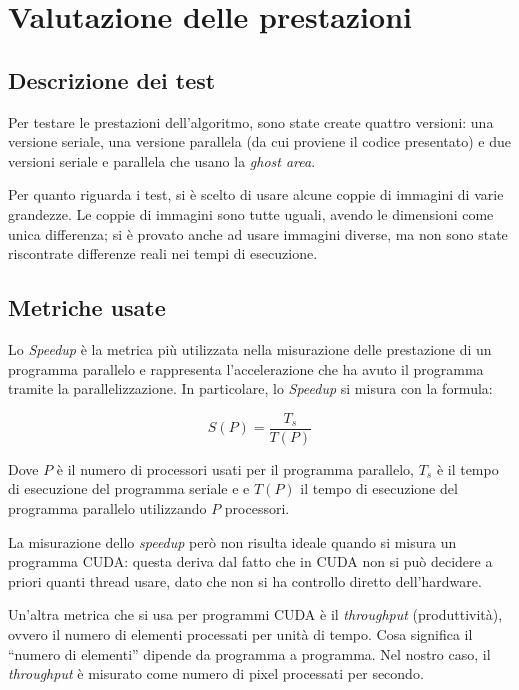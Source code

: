 \documentclass[12pt,a4paper,openright,twoside]{report}
\begin{document}
\chapter{Valutazione delle prestazioni}

\section{Descrizione dei test}

Per testare le prestazioni dell'algoritmo, sono state create quattro versioni: una versione seriale, una versione parallela (da cui proviene il codice presentato) e due versioni seriale e parallela che usano la \textit{ghost area}.

Per quanto riguarda i test, si è scelto di usare alcune coppie di immagini di varie grandezze. Le coppie di immagini sono tutte uguali, avendo le dimensioni come unica differenza; si è provato anche ad usare immagini diverse, ma non sono state riscontrate differenze reali nei tempi di esecuzione.


\section{Metriche usate}

Lo \textit{Speedup} è la metrica più utilizzata nella misurazione delle prestazione di un programma parallelo e rappresenta l'accelerazione che ha avuto il programma tramite la parallelizzazione. In particolare, lo \textit{Speedup} si misura con la formula:

\[ S(P) = \frac{T_{s}}{T(P)}  \]

Dove $P$ è il numero di processori usati per il programma parallelo, $T_{s}$ è il tempo di esecuzione del programma seriale e e $T(P)$ il tempo di esecuzione del programma parallelo utilizzando $P$ processori.

La misurazione dello \textit{speedup} però non risulta ideale quando si misura un programma CUDA: questa deriva dal fatto che in CUDA non si può decidere a priori quanti thread usare, dato che non si ha controllo diretto dell'hardware.

Un'altra metrica che si usa per programmi CUDA è il \textit{throughput} (produttività), ovvero il numero di elementi processati per unità di tempo. Cosa significa il ``numero di elementi'' dipende da programma a programma. Nel nostro caso, il \textit{throughput} è misurato come numero di pixel processati per secondo.
\end{document}
